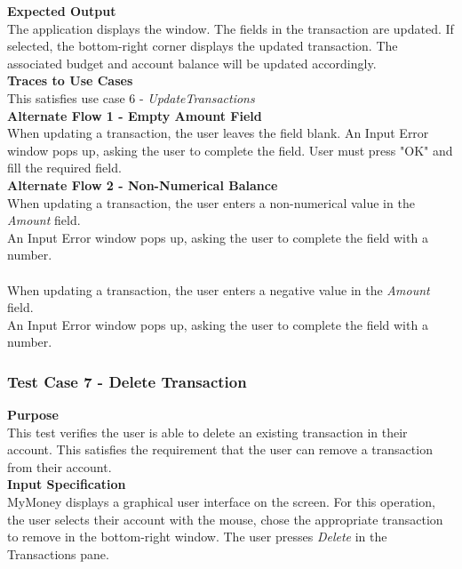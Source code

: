 \documentclass[12pt]{article}
\begin{document}
\noindent
{\bf Expected Output}\\
The application displays the window.    
The fields in the transaction are updated.
If selected, the bottom-right corner displays the updated transaction. The associated budget and account balance will be updated accordingly.\\

\noindent
    {\bf Traces to Use Cases}\\
    This satisfies use case 6 - \textit{UpdateTransactions}\\
    
\noindent
{\bf Alternate Flow 1 - Empty Amount Field}\\
When updating a transaction, the user leaves the field blank.
An Input Error window pops up, asking the user to complete the field. User must press "OK" and fill the required field.\\

\noindent
{\bf Alternate Flow 2 - Non-Numerical Balance}\\
When updating a transaction, the user enters a non-numerical value in the \textit{Amount} field. \\
An Input Error window pops up, asking the user to complete the field with a number. \\

\\
When updating a transaction, the user enters a negative value in the \textit{Amount} field. \\
An Input Error window pops up, asking the user to complete the field with a number. \\

\clearpage 


\subsubsection{Test Case 7 - Delete Transaction} \label{TC-7}
\noindent
{\bf Purpose}\\
This test verifies the user is able to delete an existing transaction in their account.
This satisfies the requirement that the user can remove a transaction from their account.\\
                                                    
\noindent
{\bf Input Specification}\\
MyMoney displays a graphical user interface on the screen.
For this operation, the user selects their account with the mouse,
chose the appropriate transaction to remove in the bottom-right window.
The user presses \textit{Delete} in the Transactions pane.\\
                                                         
\end{document}
